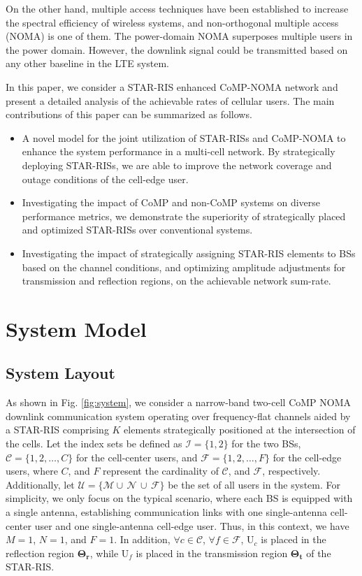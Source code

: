 \documentclass[conference]{IEEEtran}
\begin{document}
On the other hand, multiple access techniques have been established to increase the spectral efficiency of wireless systems, and non-orthogonal multiple access (NOMA) is one of them. The power-domain NOMA superposes multiple users in the power domain. However, the downlink signal could be transmitted based on any other baseline in the LTE system. 

In this paper, we consider a STAR-RIS enhanced CoMP-NOMA network and present a detailed analysis of the achievable rates of cellular users. The main contributions of this paper can be summarized as follows.
\begin{itemize}
    \item  A novel model for the joint utilization of
    STAR-RISs and CoMP-NOMA to enhance the system performance in a multi-cell network. By strategically deploying STAR-RISs, we are able to improve the network coverage and outage conditions of the cell-edge user.
    \item Investigating the impact of CoMP and non-CoMP systems on diverse performance metrics, we demonstrate the superiority of strategically placed and optimized STAR-RISs over conventional systems.
    \item Investigating the impact of strategically assigning STAR-RIS elements to BSs based on the channel conditions, and optimizing amplitude adjustments for transmission and reflection regions, on the achievable network sum-rate.

\end{itemize}

\section{System Model}
\subsection{System Layout}
As shown in Fig. \ref{fig:system}, we consider a narrow-band two-cell CoMP NOMA downlink communication system operating over frequency-flat channels aided by a STAR-RIS comprising $K$ elements strategically positioned at the intersection of the cells.
Let the index sets be defined as $\mathcal{I} = \{1, 2\}$ for the two BSs, $\mathcal{C} = \{1, 2,\dots, C\}$ for the cell-center users, and $\mathcal{F} = \{1, 2,\dots, F\}$ for the cell-edge users, where $C$, and $F$ represent the cardinality of $\mathcal{C}$, and $\mathcal{F}$, respectively. Additionally, let $\mathcal{U} = \{\mathcal{M}\cup\,\mathcal{N}\,\cup\,\mathcal{F}\}$ be the set of all users in the system. For simplicity, we only focus on the typical scenario, where each BS is equipped with a single antenna, establishing communication links with one single-antenna cell-center user and one single-antenna cell-edge user. Thus, in this context, we have $M=1$, $N=1$, and $F=1$. In addition, $\forall c \in \mathcal{C}$, $\forall f \in \mathcal{F}$, U$_c$ is placed in the reflection region $\mathbf{\Theta_r}$, while U$_f$ is placed in the transmission region $\mathbf{\Theta_t}$ of the STAR-RIS.
\end{document}
